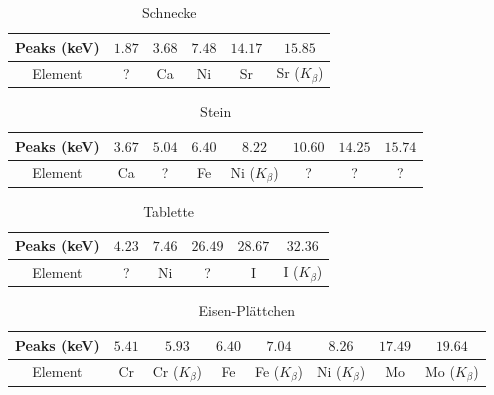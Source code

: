 \documentclass[a4paper,14pt]{article}
\begin{document}
\begin{table}[H]
	\renewcommand{\arraystretch}{1}
	\centering
	\Large
	\begin{adjustbox}{width=\textwidth}
		\begin{tabular}{|c|c|c|c|c|c|}
			\hline
			Peaks (keV) & $1.87$ & $3.68$ & $7.48$ & $14.17$ & $15.85$ \\
			\hline
			Element & ? & Ca & Ni & Sr & Sr ($K_\beta$) \\
			\hline
		\end{tabular}
	\end{adjustbox}
	\caption{ Schnecke }
	\label{tab: }
\end{table}
\begin{table}[H]
	\renewcommand{\arraystretch}{1}
	\centering
	\Large
	\begin{adjustbox}{width=\textwidth}
		\begin{tabular}{|c|c|c|c|c|c|c|c|}
			\hline
			Peaks (keV) & $3.67$ & $5.04$ & $6.40$ & $8.22$ & $10.60$ & $14.25$ & $15.74$ \\
			\hline
			Element & Ca & ? & Fe & Ni ($K_\beta$) & ? & ? & ? \\
			\hline
		\end{tabular}
	\end{adjustbox}
	\caption{ Stein }
	\label{tab: }
\end{table}
\begin{table}[H]
	\renewcommand{\arraystretch}{1}
	\centering
	\Large
	\begin{adjustbox}{width=\textwidth}
		\begin{tabular}{|c|c|c|c|c|c|}
			\hline
			Peaks (keV) & $4.23$ & $7.46$ & $26.49$ & $28.67$ & $32.36$ \\
			\hline
			Element & ? & Ni & ? & I & I ($K_\beta$) \\
			\hline
		\end{tabular}
	\end{adjustbox}
	\caption{ Tablette }
	\label{tab: }
\end{table}
\begin{table}[H]
	\renewcommand{\arraystretch}{1}
	\centering
	\Large
	\begin{adjustbox}{width=\textwidth}
		\begin{tabular}{|c|c|c|c|c|c|c|c|}
			\hline
			Peaks (keV) & $5.41$ & $5.93$ & $6.40$ & $7.04$ & $8.26$ & $17.49$ & $19.64$ \\
			\hline
			Element & Cr & Cr ($K_\beta$)  & Fe & Fe ($K_\beta$) & Ni ($K_\beta$) & Mo & Mo ($K_\beta$) \\
			\hline
		\end{tabular}
	\end{adjustbox}
	\caption{ Eisen-Pl\"attchen }
	\label{tab: }
\end{table}
\end{document}
